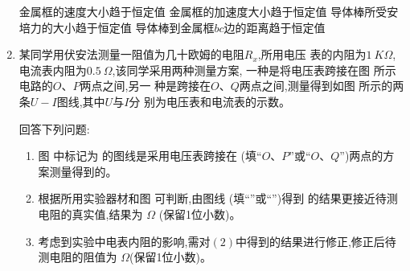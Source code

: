 \begin{enumerate}
\begin{figure}[h!]
\centering

\end{figure}


\fourchoices
{金属框的速度大小趋于恒定值}
{金属框的加速度大小趋于恒定值}
{导体棒所受安培力的大小趋于恒定值}
{导体棒到金属框$ bc $边的距离趋于恒定值}





\gaokaosy

\item 
某同学用伏安法测量一阻值为几十欧姆的电阻$ R_{x}$,所用电压
表的内阻为$ 1 \ K\Omega $,电流表内阻为$ 0.5 \ \Omega $,该同学采用两种测量方案,
一种是将电压表跨接在图  所示电路的$ O $、$ P $两点之间,另一
种是跨接在$ O $、$ Q $两点之间,测量得到如图  所示的两条$ U-I $图线,其中$ U $与$ I $分
别为电压表和电流表的示数。
\begin{figure}[!htp]
\centering
\begin{subfigure}{0.25\linewidth}
\centering
 
\caption{}\label{2020:全国1:9a}
\end{subfigure}
\hfill
\begin{subfigure}{0.71\linewidth}
\centering
 
\caption{}\label{2020:全国1:9b}
\end{subfigure}
\end{figure}



回答下列问题$ : $

\begin{enumerate}
\item
图  中标记为  的图线是采用电压表跨接在 \underlinegap (填“$ O $、$ P $”或“$ O $、$ Q $”)两点的方案测量得到的。





\item \label{2020-9-2}
根据所用实验器材和图  可判断,由图线 \underlinegap (填“”或“”)得到
的结果更接近待测电阻的真实值,结果为 \underlinegap $ \Omega $
(保留1位小数)。



\item 
考虑到实验中电表内阻的影响,需对$ (2) $中得到的结果进行修正,修正后待
测电阻的阻值为 \underlinegap 
$ \Omega $(保留1位小数)。


\end{enumerate}
\end{enumerate}
